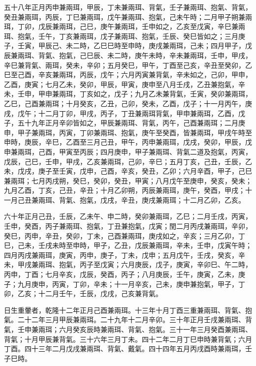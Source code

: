 \begin{pinyinscope}
五十八年正月丙申兼兩珥，甲辰，丁未兼兩珥、背氣，壬子兼兩珥、抱氣、背氣，癸丑兼兩珥，丙辰，丁巳兼兩珥，戊午兼兩珥、抱氣，己未午時；二月甲子朔兼兩珥，丁卯，戊辰兼兩珥，己巳，庚午兼兩珥，壬申如之，乙亥至戊寅，辛巳兼兩珥、抱氣，壬午，丁亥兼兩珥，戊子兼兩珥、抱氣，壬辰、癸巳皆如之；三月庚子，壬寅，甲辰己、未二時，乙巳巳時至申時，庚戌兼兩珥，己未；四月甲子，戊辰兼兩珥、背氣、抱氣，己巳辰、未二時，庚午未時，辛未兼兩珥，壬申，甲戌，辛巳兼背氣、兩珥，癸未，辛卯；五月癸巳，甲午，丁酉至己亥，辛丑至癸卯，乙巳至己酉，辛亥兼兩珥，丙辰，戊午；六月丙寅兼背氣，辛未如之，己卯，甲申，乙酉，庚寅；七月乙未，癸卯，甲辰，甲寅，庚申至八月壬戌，乙丑兼抱氣，辛未，壬申，甲申兼兩珥，丁亥如之，戊子；九月乙未兼背氣，壬寅，癸卯兼兩珥，乙巳，己酉兼兩珥；十月癸亥，乙丑，己卯，癸未，乙酉，戊子；十一月丙午，庚戌，戊午；十二月丁卯，甲戌，丙子，丁丑兼兩珥背氣，甲申兼兩珥，乙酉，戊子，五十九年正月辛卯皆如之，甲辰兼兩珥、背氣，丙午，己酉兼兩珥；二月庚申，甲子兼兩珥，丙寅，丁卯兼兩珥、抱氣，庚午至癸酉，皆兼兩珥，甲戌午時至申時，庚辰，辛巳，乙酉至三月己丑，甲午，丙申兼兩珥，戊戌，癸卯，甲辰，戊申兼兩珥，己酉，甲寅至丙辰；四月庚申，甲子兼兩珥、背氣二道及抱氣，丙寅，戊辰，己巳，壬申，甲戌，乙亥兼兩珥，己卯，辛巳；五月丁亥，己丑，壬辰，乙未，戊戌，庚子至壬寅，戊申，己酉，辛亥，癸丑，乙卯；六月辛酉，甲子，己巳兼兩珥；七月丙戌朔，癸巳，癸卯，癸丑，甲寅；八月戊午至庚申，癸亥，癸未；九月乙酉，丁亥，己丑，辛丑；十月乙卯朔，丙辰兼兩珥，庚午，癸酉，甲戌；十一月己丑兼兩珥、背氣、抱氣，戊戌，辛丑，庚戌兼兩珥；十二月乙卯，乙亥。

六十年正月己丑，壬辰，乙未午、申二時，癸卯兼兩珥，乙巳；二月壬戌，丙寅，壬申，癸酉，丙子兼兩珥、抱氣，丁丑兼抱氣，戊寅；閏二月丙戌兼兩珥，辛卯，癸巳，丙申，辛丑，癸卯，丁未，己酉兼兩珥，庚戌如之，辛亥；三月乙卯，丁巳，己未，壬戌未時至申時，甲子，乙丑，戊辰兼兩珥，辛未，壬申，戊寅午時；四月丙戌兼兩珥，庚寅，丙申，庚子，丁未，戊申；五月戊午，壬戌，癸亥，辛未，甲戌兼兩珥、抱氣，丙子至戊寅；六月庚辰，戊子，庚寅，辛卯巳、午二時，丙申，丁酉；七月辛亥，戊辰，癸酉，丙子；八月庚辰，壬午，庚寅，乙未，庚子；九月庚申，丙寅，丁卯，辛未；十一月辛亥，己未，庚申兼抱氣，甲子，丁卯，乙亥；十二月壬午，壬辰，戊戌，己亥兼背氣。

日生重暈者，乾隆十二年正月己酉兼兩珥。十三年十月丁酉三重兼兩珥、背氣、抱氣。二十二年三月甲辰兼兩珥。二十九年十二月辛卯。三十年正月壬戌兼兩珥、背氣，壬申兼兩珥；六月癸亥辰時兼兩珥、背氣、抱氣。三十一年三月癸酉兼兩珥、背氣；十月甲辰兼背氣。三十六年三月丁未。四十二年二月丁巳申時兼背氣；六月丁酉。四十三年二月戊戌兼兩珥、背氣、戴氣。四十四年五月丙戌酉時兼兩珥，壬子巳時。


\end{pinyinscope}
